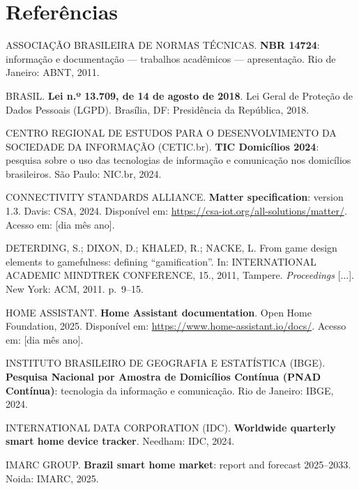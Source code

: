 \newpage
\section*{Referências}

\begingroup
\singlespacing
\setlength{\parindent}{0pt}
\setlength{\parskip}{0.7\baselineskip}

ASSOCIAÇÃO BRASILEIRA DE NORMAS TÉCNICAS. \textbf{NBR 14724}: informação e
documentação --- trabalhos acadêmicos --- apresentação. Rio de Janeiro: ABNT, 2011.

BRASIL. \textbf{Lei n.º 13.709, de 14 de agosto de 2018}. Lei Geral de Proteção de
Dados Pessoais (LGPD). Brasília, DF: Presidência da República, 2018.

CENTRO REGIONAL DE ESTUDOS PARA O DESENVOLVIMENTO DA SOCIEDADE DA INFORMAÇÃO
(CETIC.br). \textbf{TIC Domicílios 2024}: pesquisa sobre o uso das tecnologias de
informação e comunicação nos domicílios brasileiros. São Paulo: NIC.br, 2024.

CONNECTIVITY STANDARDS ALLIANCE. \textbf{Matter specification}: version 1.3. Davis:
CSA, 2024. Disponível em: \url{https://csa-iot.org/all-solutions/matter/}. Acesso em:
[dia mês ano].

DETERDING, S.; DIXON, D.; KHALED, R.; NACKE, L. From game design elements to
gamefulness: defining ``gamification''. In: INTERNATIONAL ACADEMIC MINDTREK
CONFERENCE, 15., 2011, Tampere. \textit{Proceedings} [...]. New York: ACM, 2011.
p.~9--15.

HOME ASSISTANT. \textbf{Home Assistant documentation}. Open Home Foundation, 2025.
Disponível em: \url{https://www.home-assistant.io/docs/}. Acesso em: [dia mês ano].

INSTITUTO BRASILEIRO DE GEOGRAFIA E ESTATÍSTICA (IBGE). \textbf{Pesquisa Nacional por
Amostra de Domicílios Contínua (PNAD Contínua)}: tecnologia da informação e
comunicação. Rio de Janeiro: IBGE, 2024.

INTERNATIONAL DATA CORPORATION (IDC). \textbf{Worldwide quarterly smart home device
tracker}. Needham: IDC, 2024.

IMARC GROUP. \textbf{Brazil smart home market}: report and forecast 2025--2033.
Noida: IMARC, 2025.

